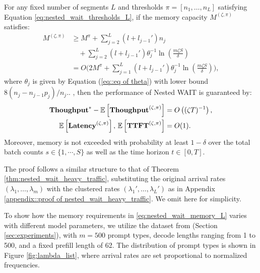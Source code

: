 \begin{theorem}
\label{thm:nested_wait_heavy_traffic, any segment}
For any fixed number of segments $L$ and thresholds $\pi = [n_1, \dots, n_L]$ satisfying Equation \eqref{eq:nested_wait_thresholds_L}, if the memory capacity $M^{(\zeta, \pi)}$ satisfies:
\begin{equation}
    \label{eq:nested_wait_memory_L}
    \begin{aligned}
M^{(\zeta, \pi)} 
&\geq M^\pi 
+ \sum_{j=2}^L (l + l_{j-1}') n_j \\
&\quad 
+ \sum_{j=2}^L (l + l_{j-1}') \theta_j^{-1} 
\ln\left( \frac{m \zeta S}{\delta} \right) \\
&= O\biggl( 2M^\pi 
+ \sum_{j=1}^L (l + l_{j-1}') \theta_j^{-1}
\ln\left( \frac{m \zeta S}{\delta} \right) \biggr),
    \end{aligned}
\end{equation}
where $\theta_j$ is given by Equation (\ref{eq::eq of theta}) with lower bound $8(n_j-n_{j-1}p_j)/n_j..$
, then the performance of Nested WAIT is guaranteed by:
\[ 
    \begin{aligned}
        \textbf{Thoughput}^* 
- \mathbb{E}\left[ \textbf{Thoughput}^{(\zeta, \pi)} \right] 
&= O\left( (\zeta T)^{-1} \right), \\
\mathbb{E}\left[ \textbf{Latency}^{(\zeta, \pi)} \right] ,\,\mathbb{E}\left[ \textbf{TTFT}^{(\zeta, \pi)} \right] 
&= O(1).
    \end{aligned}
\]
Moreover, memory is not exceeded with probability at least \( 1 - \delta \) over the total batch counts $s\in \{1,\cdots,S\}$ as well as the time horizon $t \in [0, T]$.
\end{theorem}

The proof follows a similar structure to that of Theorem \ref{thm:nested_wait_heavy_traffic}, substituting the original arrival rates $(\lambda_1, \dots, \lambda_m)$ with the clustered rates $(\lambda_1', \dots, \lambda_L')$ as in Appendix \ref{appendix::proof of nested_wait_heavy_traffic}. We omit here for simplicity.

To show how the memory requirements in \eqref{eq:nested_wait_memory_L} varies with different model parameters, we utilize the dataset from \cite{zheng2023lmsys} (Section \ref{sec:experiments}), with $m = 500$ prompt types, decode lengths ranging from 1 to 500, and a fixed prefill length of 62. The distribution of prompt types is shown in Figure \ref{fig:lambda_list}, where arrival rates are set proportional to normalized frequencies.

